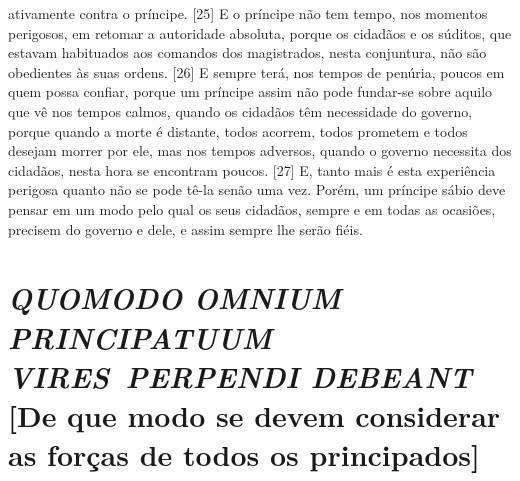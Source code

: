 ativamente contra o príncipe. {[}25{]} E o príncipe não tem tempo, nos
momentos perigosos, em retomar a autoridade absoluta, porque os cidadãos
e os súditos, que estavam habituados aos comandos dos magistrados, nesta
conjuntura, não são obedientes às suas ordens. {[}26{]} E sempre terá,
nos tempos de penúria, poucos em quem possa confiar, porque um príncipe
assim não pode fundar-se sobre aquilo que vê nos tempos calmos, quando
os cidadãos têm necessidade do governo, porque quando a morte é
distante, todos acorrem, todos prometem e todos desejam morrer por ele,
mas nos tempos adversos, quando o governo necessita dos cidadãos, nesta
hora se encontram poucos. {[}27{]} E, tanto mais é esta experiência
perigosa quanto não se pode tê-la senão uma vez. Porém, um príncipe
sábio deve pensar em um modo pelo qual os seus cidadãos, sempre e em
todas as ocasiões, precisem do governo e dele, e assim sempre lhe serão
fiéis.

\quebra\section{\emph{QUOMODO OMNIUM PRINCIPATUUM VIRES~PERPENDI DEBEANT}\break
{[}De que modo se devem considerar as forças de todos os principados{]}}


